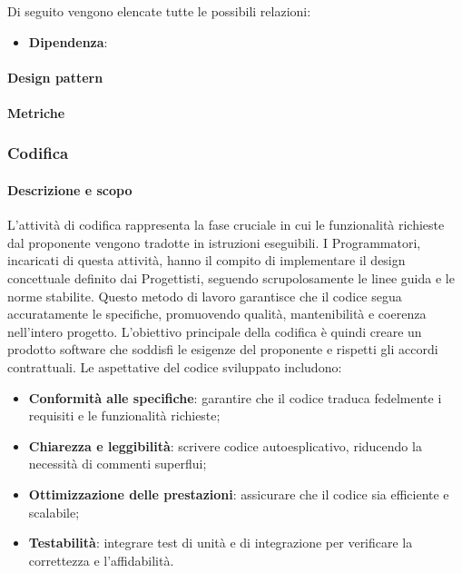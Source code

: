      Di seguito vengono elencate tutte le possibili relazioni:
     \begin{itemize}
        \item \textbf{Dipendenza}:
     \end{itemize}
    
    \paragraph{Design pattern}
    
    \paragraph{Metriche}
    \subsubsection{Codifica}

    \paragraph{Descrizione e scopo} 
    L’attività di codifica rappresenta la fase cruciale in cui le funzionalità richieste dal proponente vengono tradotte in istruzioni eseguibili. I Programmatori, incaricati di questa attività, hanno il compito di implementare il design concettuale definito dai Progettisti, seguendo scrupolosamente le linee guida e le norme stabilite. Questo metodo di lavoro garantisce che il codice segua accuratamente le specifiche, promuovendo qualità, mantenibilità e coerenza nell’intero progetto.
    L’obiettivo principale della codifica è quindi creare un prodotto software che soddisfi le esigenze del proponente e rispetti gli accordi contrattuali. Le aspettative del codice sviluppato includono:
    \begin{itemize}
        \item \textbf{Conformità alle specifiche}: garantire che il codice traduca fedelmente i requisiti e le funzionalità richieste;
        \item \textbf{Chiarezza e leggibilità}: scrivere codice autoesplicativo, riducendo la necessità di commenti superflui;
        \item \textbf{Ottimizzazione delle prestazioni}: assicurare che il codice sia efficiente e scalabile;
        \item \textbf{Testabilità}: integrare test di unità e di integrazione per verificare la correttezza e l’affidabilità.
    \end{itemize}
    
